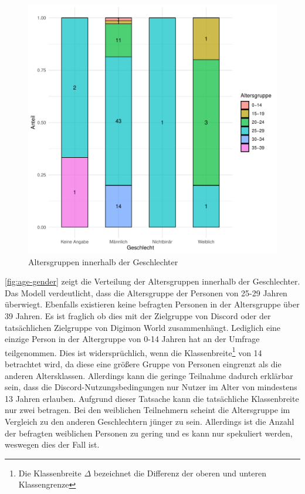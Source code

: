 \begin{figure}[H]
  \centering
  \includegraphics[width=0.65\columnwidth]{figures/plots/age_gender.pdf}
  \caption{\label{fig:age-gender} Altersgruppen innerhalb der Geschlechter}
\end{figure}

\autoref{fig:age-gender} zeigt die Verteilung der Altersgruppen innerhalb der Geschlechter.
Das Modell verdeutlicht, dass die Altersgruppe der Personen von 25-29 Jahren überwiegt.
Ebenfalls existieren keine befragten Personen in der Altersgruppe über 39 Jahren.
Es ist fraglich ob dies mit der Zielgruppe von Discord oder der tatsächlichen Zielgruppe von Digimon World zusammenhängt.
Lediglich eine einzige Person in der Altergruppe von 0-14 Jahren hat an der Umfrage teilgenommen.
Dies ist widersprüchlich, wenn die Klassenbreite\footnote{Die Klassenbreite $\Delta$ bezeichnet die Differenz der oberen und unteren Klassengrenze\cite[S.27]{elementare-stochastik}} von 14 betrachtet wird, da diese eine größere Gruppe von Personen eingrenzt als die anderen Altersklassen.
Allerdings kann die geringe Teilnahme dadurch erklärbar sein, dass die Discord-Nutzungsbedingungen nur Nutzer im Alter von mindestens 13 Jahren erlauben.
Aufgrund dieser Tatsache kann die tatsächliche Klassenbreite nur zwei betragen.
Bei den weiblichen Teilnehmern scheint die Altersgruppe im Vergleich zu den anderen Geschlechtern jünger zu sein.
Allerdings ist die Anzahl der befragten weiblichen Personen zu gering und es kann nur spekuliert werden, weswegen dies der Fall ist. \\

